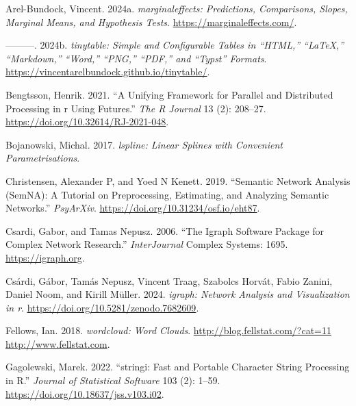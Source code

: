 \documentclass[
]{article}
\newlength{\cslhangindent}
\newlength{\cslentryspacingunit} %
\newenvironment{CSLReferences}[2] %
 {%
  \setlength{\parindent}{0pt}
  \ifodd #1
  \let\oldpar\par
  \def\par{\hangindent=\cslhangindent\oldpar}
  \fi
  \setlength{\parskip}{#2\cslentryspacingunit}
 }%
 {}
\begin{document}
\hypertarget{refs}{}
\begin{CSLReferences}{1}{0}
\leavevmode{}%
Arel-Bundock, Vincent. 2024a. \emph{{marginaleffects}: Predictions,
Comparisons, Slopes, Marginal Means, and Hypothesis Tests}.
\url{https://marginaleffects.com/}.

\leavevmode{}%
---------. 2024b. \emph{{tinytable}: Simple and Configurable Tables in
{``{HTML},''} {``{LaTeX},''} {``{Markdown},''} {``{Word},''}
{``{PNG},''} {``{PDF},''} and {``{Typst}''} Formats}.
\url{https://vincentarelbundock.github.io/tinytable/}.

\leavevmode{}%
Bengtsson, Henrik. 2021. {``A Unifying Framework for Parallel and
Distributed Processing in r Using Futures.''} \emph{The R Journal} 13
(2): 208--27. \url{https://doi.org/10.32614/RJ-2021-048}.

\leavevmode{}%
Bojanowski, Michal. 2017. \emph{{lspline}: Linear Splines with
Convenient Parametrisations}.

\leavevmode{}%
Christensen, Alexander P, and Yoed N Kenett. 2019. {``Semantic Network
Analysis {(SemNA)}: A Tutorial on Preprocessing, Estimating, and
Analyzing Semantic Networks.''} \emph{PsyArXiv}.
\url{https://doi.org/10.31234/osf.io/eht87}.

\leavevmode{}%
Csardi, Gabor, and Tamas Nepusz. 2006. {``The Igraph Software Package
for Complex Network Research.''} \emph{InterJournal} Complex Systems:
1695. \url{https://igraph.org}.

\leavevmode{}%
Csárdi, Gábor, Tamás Nepusz, Vincent Traag, Szabolcs Horvát, Fabio
Zanini, Daniel Noom, and Kirill Müller. 2024. \emph{{igraph}: Network
Analysis and Visualization in r}.
\url{https://doi.org/10.5281/zenodo.7682609}.

\leavevmode{}%
Fellows, Ian. 2018. \emph{{wordcloud}: Word Clouds}.
\href{http://blog.fellstat.com/?cat=11\%20http://www.fellstat.com}{http://blog.fellstat.com/?cat=11
http://www.fellstat.com}.

\leavevmode{}%
Gagolewski, Marek. 2022. {``{stringi}: {F}ast and Portable Character
String Processing in {R}.''} \emph{Journal of Statistical Software} 103
(2): 1--59. \url{https://doi.org/10.18637/jss.v103.i02}.


\end{CSLReferences}
\end{document}
